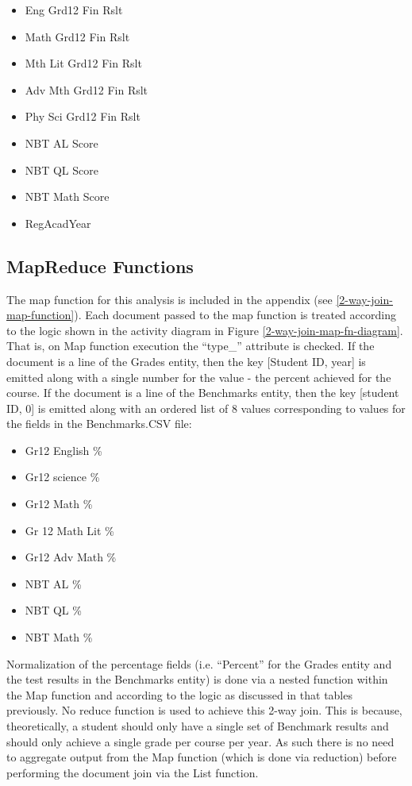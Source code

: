 \begin{enumerate}
\begin{itemize}
              \item Eng Grd12 Fin Rslt
              \item Math Grd12 Fin Rslt
              \item Mth Lit Grd12 Fin Rslt
              \item Adv Mth Grd12 Fin Rslt
              \item Phy Sci Grd12 Fin Rslt
              \item NBT AL Score
              \item NBT QL Score
              \item NBT Math Score
              \item RegAcadYear
          \end{itemize}
\end{enumerate}

\subsection{MapReduce Functions}
The map function for this analysis is included in the appendix (see \ref{2-way-join-map-function}). Each document passed to the map function is treated according to the logic shown in the activity diagram in Figure \ref{2-way-join-map-fn-diagram}. That is, on Map function execution the ``type\_'' attribute is checked. If the document is a line of the Grades entity, then the key [Student ID, year] is emitted along with a single number for the value - the percent achieved for the course. If the document is a line of the Benchmarks entity, then the key [student ID, 0] is emitted along with an ordered list of 8 values corresponding to values for the fields in the Benchmarks.CSV file:

\begin{itemize}
    \item Gr12 English \%
    \item Gr12 science \%
    \item Gr12 Math \%
    \item Gr 12 Math Lit \%
    \item Gr12 Adv Math \%
    \item NBT AL \%
    \item NBT QL \%
    \item NBT Math \%
\end{itemize}

Normalization of the percentage fields (i.e. ``Percent'' for the Grades entity and the test results in the Benchmarks entity) is done via a nested function within the Map function and according to the logic as discussed in that tables previously. No reduce function is used to achieve this 2-way join. This is because, theoretically, a student should only have a single set of Benchmark results and should only achieve a single grade per course per year. As such there is no need to aggregate output from the Map function (which is done via reduction) before performing the document join via the List function.

